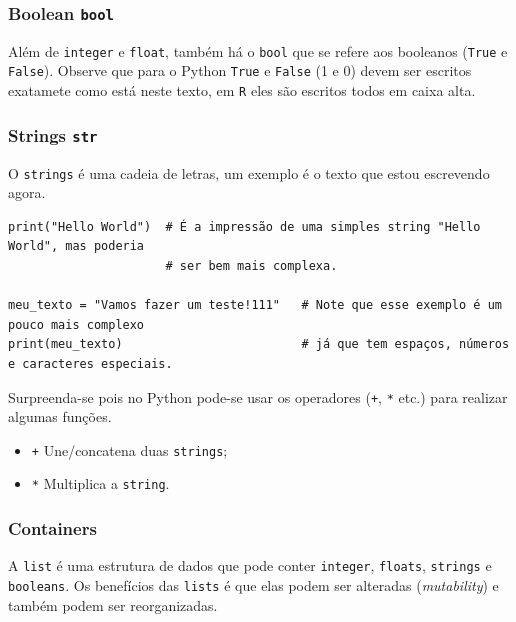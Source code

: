 \documentclass[]{book}
\providecommand{\tightlist}{%
  \setlength{\itemsep}{0pt}\setlength{\parskip}{0pt}}
\begin{document}
\subsubsection{\texorpdfstring{Boolean
\texttt{bool}}{Boolean bool}}\label{boolean-bool}

Além de \texttt{integer} e \texttt{float}, também há o \texttt{bool} que
se refere aos booleanos (\texttt{True} e \texttt{False}). Observe que
para o Python \texttt{True} e \texttt{False} (1 e 0) devem ser escritos
exatamete como está neste texto, em \texttt{R} eles são escritos todos
em caixa alta.

\subsubsection{\texorpdfstring{Strings
\texttt{str}}{Strings str}}\label{strings-str}

O \texttt{strings} é uma cadeia de letras, um exemplo é o texto que
estou escrevendo agora.

\begin{verbatim}
print("Hello World")  # É a impressão de uma simples string "Hello World", mas poderia
                      # ser bem mais complexa.

meu_texto = "Vamos fazer um teste!111"   # Note que esse exemplo é um pouco mais complexo
print(meu_texto)                         # já que tem espaços, números e caracteres especiais.
\end{verbatim}

Surpreenda-se pois no Python pode-se usar os operadores (\texttt{+},
\texttt{*} etc.) para realizar algumas funções.

\begin{itemize}
\tightlist
\item
  \texttt{+} Une/concatena duas \texttt{strings};
\item
  \texttt{*} Multiplica a \texttt{string}.
\end{itemize}

\subsubsection{Containers}\label{containers}

A \texttt{list} é uma estrutura de dados que pode conter
\texttt{integer}, \texttt{floats}, \texttt{strings} e \texttt{booleans}.
Os benefícios das \texttt{lists} é que elas podem ser alteradas
(\emph{mutability}) e também podem ser reorganizadas.
\end{document}
